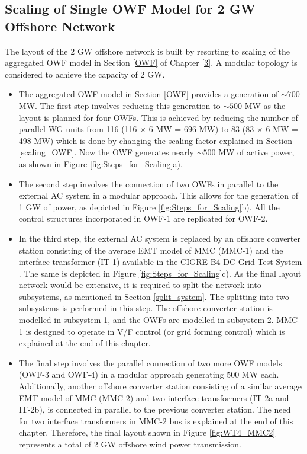 \subsection{Scaling of Single OWF Model for 2 GW Offshore Network}\label{scaling_2GW}

The layout of the 2 GW offshore network is built by resorting to scaling of the aggregated \gls{OWF} model in Section \ref{OWF} of Chapter \ref{3}. A modular topology is considered to achieve the capacity of 2 GW. 

\begin{itemize}
    \item The aggregated \gls{OWF} model in Section \ref{OWF} provides a generation of $\sim{700}$ MW. The first step involves reducing this generation to $\sim{500}$ MW as the layout is planned for four \gls{OWF}s. This is achieved by reducing the number of parallel \gls{WG} units from 116 (116 $\times$ 6 MW = 696 MW) to 83 (83 $\times$ 6 MW = 498 MW) which is done by changing the scaling factor explained in Section \ref{scaling_OWF}. Now the \gls{OWF} generates nearly $\sim{500}$ MW of active power, as shown in Figure \ref{fig:Steps_for_Scaling}a).
    \item The second step involves the connection of two \gls{OWF}s in parallel to the external \gls{AC} system in a modular approach. This allows for the generation of 1 GW of power, as depicted in Figure \ref{fig:Steps_for_Scaling}b). All the control structures incorporated in \gls{OWF}-1 are replicated for \gls{OWF}-2.
    \item In the third step, the external \gls{AC} system is replaced by an offshore converter station consisting of the average \gls{EMT} model of \gls{MMC} (\gls{MMC}-1) and the interface transformer (IT-1) available in the CIGRE B4 DC Grid Test System \cite{vrana2013cigre}. The same is depicted in Figure \ref{fig:Steps_for_Scaling}c). As the final layout network would be extensive, it is required to split the network into subsystems, as mentioned in Section  \ref{split_system}. The splitting into two subsystems is performed in this step. The offshore converter station is modelled in subsystem-1, and the \gls{OWF}s are modelled in subsystem-2. \gls{MMC}-1 is designed to operate in V/F control (or grid forming control) which is explained at the end of this chapter.
    \item The final step involves the parallel connection of two more \gls{OWF} models (\gls{OWF}-3 and \gls{OWF}-4) in a modular approach generating 500 MW each. Additionally, another offshore converter station consisting of a similar average \gls{EMT} model of \gls{MMC} (\gls{MMC}-2) and two interface transformers (IT-2a and IT-2b), is connected in parallel to the previous converter station. The need for two interface transformers in \gls{MMC}-2 bus is explained at the end of this chapter. Therefore, the final layout shown in Figure \ref{fig:WT4_MMC2} represents a total of 2 GW offshore wind power transmission.
\end{itemize}


